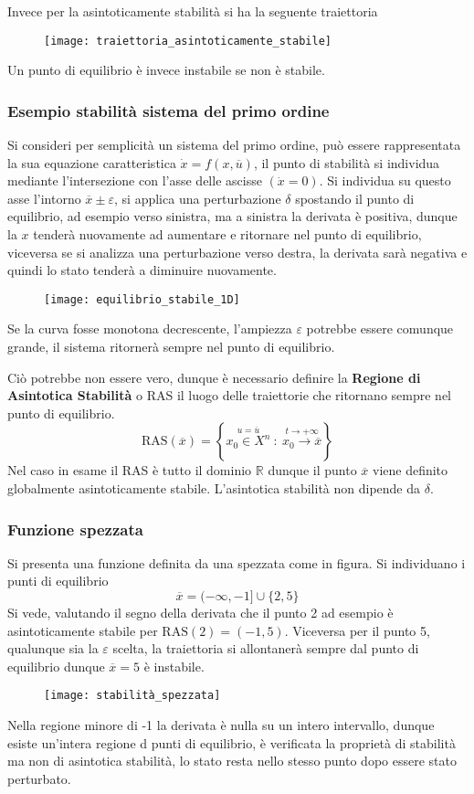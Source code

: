 Invece per la asintoticamente stabilità si ha la seguente traiettoria
\begin{figure}[h]
\centering
\texttt{[image: traiettoria\_asintoticamente\_stabile]}
\end{figure}

Un punto di equilibrio è invece instabile se non è stabile.

\newpage
\subsubsection{Esempio stabilità sistema del primo ordine}
Si consideri per semplicità un sistema del primo ordine, può essere
rappresentata la sua equazione caratteristica
$\dot{x} = f(x,\overline{u})$, il punto di stabilità si individua mediante
l'intersezione con l'asse delle ascisse $(\dot{x}=0)$. Si individua su questo
asse l'intorno $\overline{x} \pm \varepsilon$,
si applica una perturbazione $\delta$ spostando il punto di equilibrio, ad
esempio verso sinistra, ma a sinistra la derivata è positiva, dunque la $x$
tenderà nuovamente ad aumentare e ritornare nel punto di equilibrio, viceversa
se si analizza una perturbazione verso destra, la
derivata sarà negativa e quindi lo stato tenderà a diminuire nuovamente.
\begin{figure}[h]
\centering
\texttt{[image: equilibrio\_stabile\_1D]}
\end{figure}
Se la curva fosse monotona decrescente, l'ampiezza $\varepsilon$ potrebbe
essere comunque grande, il sistema ritornerà sempre nel punto di
equilibrio.

Ciò potrebbe non essere vero, dunque è necessario definire la \textbf{Regione
di Asintotica Stabilità} o RAS il luogo delle traiettorie che ritornano sempre
nel punto di equilibrio.
$$
\text{RAS}(\overline{x})=\left\{ \stackrel{u=\overline{u}}{x_0\in X^n}
\ :\ \stackrel{t\to+\infty}{ x_0 \to \overline{x} }\right\}
$$
Nel caso in esame il RAS è tutto il dominio $\mathbb{R}$ dunque il punto
$\overline{x}$ viene definito globalmente asintoticamente stabile.
L'asintotica stabilità non dipende da $\delta$.

\newpage
\subsubsection{Funzione spezzata}
Si presenta una funzione definita da una spezzata come in figura.
Si individuano i punti di equilibrio
$$
\overline{x} = (-\infty,-1] \cup \{2,5\}
$$
Si vede, valutando il segno della derivata che il punto 2 ad esempio è
asintoticamente stabile per $\text{RAS}(2) = (-1,5)$.
Viceversa per il punto 5, qualunque sia la $\varepsilon$ scelta, la traiettoria
si allontanerà sempre dal punto di equilibrio dunque $\overline{x}=5$ è
instabile.
\begin{figure}[h]
\centering
\texttt{[image: stabilità\_spezzata]}
\end{figure}
Nella regione  minore di -1 la derivata è nulla su un intero intervallo, dunque
esiste un'intera regione d punti di equilibrio, è verificata la proprietà di
stabilità ma non di asintotica stabilità, lo stato resta nello stesso punto
dopo essere stato perturbato.

